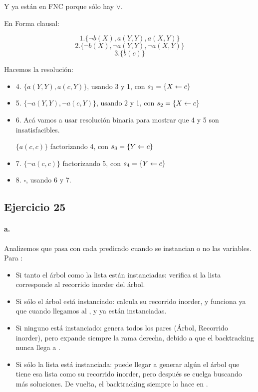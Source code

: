 Y ya están en FNC porque sólo hay $\lor$.

En Forma clausal:

\[1. \{\lnot b(X), a(Y,Y), a(X,Y)\}\]
\[2. \{\lnot b(X), \lnot a(Y,Y), \lnot a(X,Y)\}\]
\[3. \{b(c)\}\]

Hacemos la resolución:

\begin{itemize}
  \item 4. $\{a(Y,Y), a(c,Y)\}$, usando 3 y 1, con $s_1=\{X \leftarrow c\}$
  \item 5. $\{\lnot a(Y,Y), \lnot a(c,Y)\}$, usando 2 y 1, con $s_2=\{X \leftarrow c\}$
  \item 6. Acá vamos a usar resolución binaria para mostrar que 4 y 5 son insatisfacibles.

  $\{a(c,c)\}$ factorizando 4, con $s_3=\{Y \leftarrow c\}$
  \item 7. $\{\lnot a(c,c)\}$ factorizando 5, con $s_4=\{Y \leftarrow c\}$
  \item 8. $\square$, usando 6 y 7.
\end{itemize}

\subsection*{Ejercicio 25}

\paragraph{a.}

Analizemos que pasa con cada predicado cuando se instancian o no las variables. Para :

\begin{itemize}
  \item Si tanto el árbol como la lista están instanciadas: verifica si la lista corresponde al recorrido inorder del árbol.
  \item Si sólo el árbol está instanciado: calcula su recorrido inorder, y funciona ya que cuando llegamos al ,  y  ya están instanciadas.
  \item Si ninguno está instanciado: genera todos los pares (Árbol, Recorrido inorder), pero expande siempre la rama derecha, debido a que el backtracking nunca llega a .
  \item Si sólo la lista está instanciada: puede llegar a generar algún el árbol que tiene esa lista como su recorrido inorder, pero después se cuelga buscando más soluciones. De vuelta, el backtracking siempre lo hace en .
\end{itemize}

